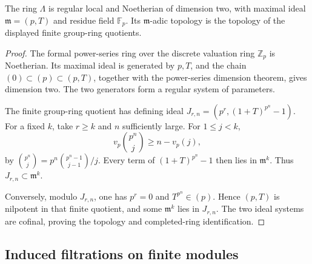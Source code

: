\begin{lemma}
\label{v4-arith:w5-i:lem:iwasawa-noeth}
The ring \(\Lambda\) is regular local and Noetherian of dimension two,
with maximal ideal \(\mathfrak m=(p,T)\) and residue field
\(\mathbb F_p\). Its \(\mathfrak m\)-adic topology is the topology
of the displayed finite group-ring quotients.
\end{lemma}
\begin{proof}
The formal power-series ring over the discrete valuation ring
\(\mathbb Z_p\) is Noetherian. Its maximal ideal is generated by
\(p,T\), and the chain \((0)\subset(p)\subset(p,T)\), together with
the power-series dimension theorem, gives dimension two.
The two generators form a regular system of parameters.

The finite group-ring quotient has defining ideal
\(J_{r,n}=(p^r,(1+T)^{p^n}-1)\).
For a fixed \(k\), take \(r\ge k\) and \(n\) sufficiently large.
For \(1\le j<k\),
\[
 v_p\binom{p^n}{j}\ge n-v_p(j),
\]
by \(\binom{p^n}{j}=p^n\binom{p^n-1}{j-1}/j\).
Every term of \((1+T)^{p^n}-1\) then lies in \(\mathfrak m^k\).
Thus \(J_{r,n}\subset\mathfrak m^k\).

Conversely, modulo \(J_{r,n}\), one has \(p^r=0\) and
\(T^{p^n}\in(p)\). Hence \((p,T)\) is nilpotent in that finite
quotient, and some \(\mathfrak m^k\) lies in \(J_{r,n}\).
The two ideal systems are cofinal, proving the topology and
completed-ring identification.
\end{proof}

\subsection{Induced filtrations on finite modules}
\label{v4-arith:w5-i:artin-rees}

